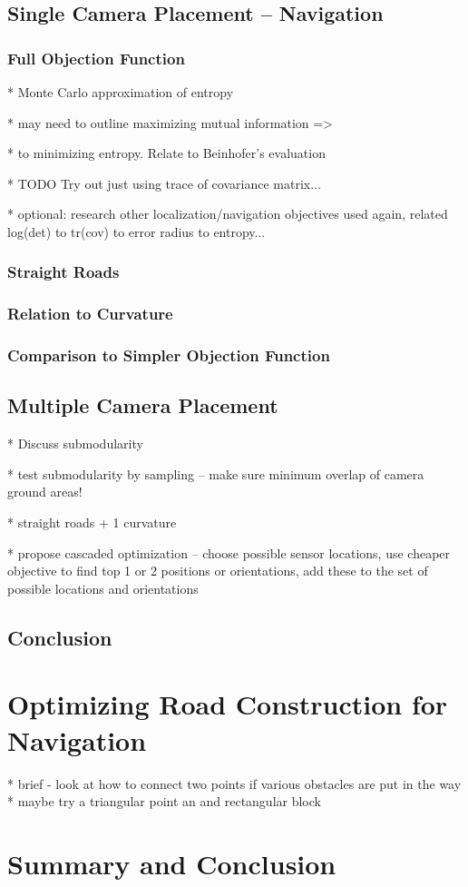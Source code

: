 \documentclass[a4paper,12pt,twoside,openright]{report}
\begin{document}



\section{Single Camera Placement -- Navigation}

\subsection{Full Objection Function}
* Monte Carlo approximation of entropy

* may need to outline maximizing mutual information =>

* to minimizing entropy. Relate to Beinhofer's evaluation

* TODO Try out just using trace of covariance matrix...

* optional: research other localization/navigation objectives used again, related log(det) to tr(cov) to error radius to entropy...
\subsection{Straight Roads}

\subsection{Relation to Curvature}

\subsection{Comparison to Simpler Objection Function}



\section{Multiple Camera Placement}
* Discuss submodularity

* test submodularity by sampling -- make sure minimum overlap of camera ground areas!

* straight roads + 1 curvature

* propose cascaded optimization -- choose possible sensor locations, use cheaper objective to find top 1 or 2 
positions or orientations, add these to the set of possible locations and orientations



\section{Conclusion}

\chapter{Optimizing Road Construction for Navigation}

* brief - look at how to connect two points if various obstacles are put in the way
* maybe try a triangular point an and rectangular block 


\chapter{Summary and Conclusion} 




\appendix
\singlespacing

\printbibliography
\end{document}
